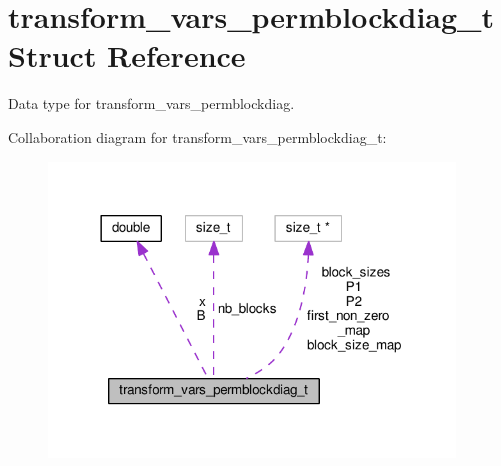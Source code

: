 \hypertarget{structtransform__vars__permblockdiag__t}{}\section{transform\+\_\+vars\+\_\+permblockdiag\+\_\+t Struct Reference}
\label{structtransform__vars__permblockdiag__t}


Data type for transform\+\_\+vars\+\_\+permblockdiag.  




Collaboration diagram for transform\+\_\+vars\+\_\+permblockdiag\+\_\+t\+:\nopagebreak
\begin{figure}[H]
\begin{center}
\leavevmode
\includegraphics[width=306pt]{structtransform__vars__permblockdiag__t__coll__graph}
\end{center}
\end{figure}
